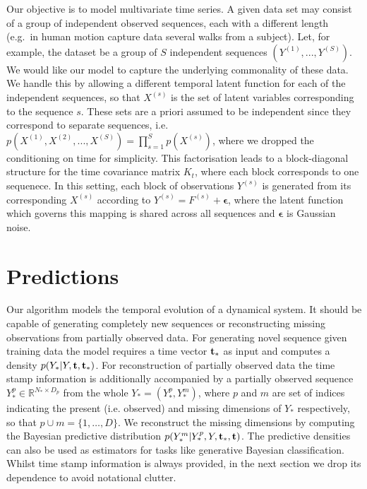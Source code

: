 \documentclass{article} %
\begin{document}
Our objective is to model multivariate time series. A given data set
may consist of a group of independent observed sequences, each with
a different length (e.g.\ in human motion capture data several walks
from a subject). Let, for example, the dataset be a group of
$S$ independent sequences  $\left( Y^{(1)}, ..., Y^{(S)} \right)$. We would like our model to capture the underlying
commonality of these data. We handle this by allowing a different temporal latent function for each of the independent
sequences, so that $X^{(s)}$ is the set of latent variables corresponding to the sequence $s$.
%
These sets are a priori assumed to be independent since they correspond to separate sequences, i.e.\ $p\left( X^{(1)}, X^{(2)}, ..., X^{(S)} \right) = \prod_{s=1}^S p(X^{(s)})$, where we dropped the
conditioning on time for simplicity.
%
This factorisation leads to a block-diagonal structure for the time covariance matrix $K_t$, where each block corresponds to one sequenece.
 In this setting, each block of observations $Y^{(s)}$ is generated from its corresponding $X^{(s)}$
according to $Y^{(s)} = F^{(s)} + \boldsymbol \epsilon$, where the latent function which governs this mapping is shared across all sequences and 
$\boldsymbol \epsilon$ is Gaussian noise. 



\section{Predictions} 

Our algorithm models the temporal evolution of a dynamical system. It
should be capable of generating completely new sequences or
reconstructing missing observations from partially observed data. For
generating novel sequence given training data the model requires a
time vector $\mathbf{t}_*$ as input and computes a density $p(Y_* | Y, \mathbf{t},
\mathbf{t}_*)$. For reconstruction of partially observed data the time stamp
information is additionally accompanied by a partially observed
sequence $Y_*^{p} \in \mathbb{R}^{N_* \times D_p}$ from the whole $Y_*
= (Y_*^{p}, Y_*^{m})$, where $p$ and $m$ are set of indices indicating
the present (i.e. observed) and missing dimensions of $Y_*$
respectively, so that $p \cup m= \{1,\ldots,D\}$.  We reconstruct the
missing dimensions by computing the Bayesian predictive distribution
$p(Y_*^{m}| Y_*^{p}, Y, \mathbf{t}_*, \mathbf{t})$. The predictive densities can
also be used as estimators for tasks like generative Bayesian
classification.
 Whilst time stamp information is always provided, in the
next section we drop its dependence to avoid notational clutter.
\end{document}
